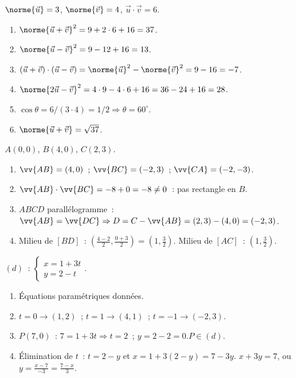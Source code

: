 
$\norme{\vec{u}}=3$, $\norme{\vec{v}}=4$, $\vec{u}\cdot\vec{v}=6$.
\begin{enumerate}
  \item $\norme{\vec{u}+\vec{v}}^2=9+2\cdot6+16=37$.
  \item $\norme{\vec{u}-\vec{v}}^2=9-12+16=13$.
  \item $(\vec{u}+\vec{v})\cdot(\vec{u}-\vec{v})=\norme{\vec{u}}^2-\norme{\vec{v}}^2=9-16=-7$.
  \item $\norme{2\vec{u}-\vec{v}}^2=4\cdot9-4\cdot6+16=36-24+16=28$.
  \item $\cos\theta=6/(3\cdot4)=1/2\Rightarrow\theta=60^{\circ}$.
  \item $\norme{\vec{u}+\vec{v}}=\sqrt{37}$.
\end{enumerate}


$A(0,0)$, $B(4,0)$, $C(2,3)$.
\begin{enumerate}
  \item $\vv{AB}=(4,0)$~; $\vv{BC}=(-2,3)$~; $\vv{CA}=(-2,-3)$.
  \item $\vv{AB}\cdot\vv{BC}=-8+0=-8\ne0$~: pas rectangle en $B$.
  \item $ABCD$ parall\'elogramme~: $\vv{AB}=\vv{DC}\Rightarrow D=C-\vv{AB}=(2,3)-(4,0)=(-2,3)$.
  \item Milieu de $[BD]$~: $(\frac{4-2}{2},\frac{0+3}{2})=(1,\frac{3}{2})$.
        Milieu de $[AC]$~: $(1,\frac{3}{2})$.\checkmark
\end{enumerate}


$(d)$~: $\begin{cases}x=1+3t\\y=2-t\end{cases}$.
\begin{enumerate}
  \item \'Equations param\'etriques donn\'ees.\checkmark
  \item $t=0\to(1,2)$~; $t=1\to(4,1)$~; $t=-1\to(-2,3)$.
  \item $P(7,0)$~: $7=1+3t\Rightarrow t=2$~; $y=2-2=0$.\checkmark\quad $P\in(d)$.
  \item \'Elimination de $t$~: $t=2-y$ et $x=1+3(2-y)=7-3y$.
        $x+3y=7$, ou $y=\frac{x-7}{-3}=\frac{7-x}{3}$.
\end{enumerate}


